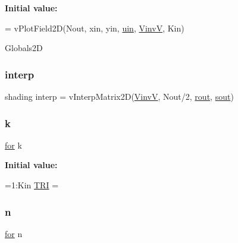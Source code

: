 {\bfseries Initial value\+:}
\begin{DoxyCode}
= vPlotField2D(Nout, xin, yin, \hyperlink{a00473_ab528855467ba0360924bbd0dd81edb35}{uin}, \hyperlink{a00473_a8ef32285093ff36729ef70bb1e8149c4}{VinvV}, Kin)


Globals2D
\end{DoxyCode}
\mbox{\label{a00563_a7626c967b638c3cc70c7c96863cbd07f}} 
\subsubsection{\texorpdfstring{interp}{interp}}
{\footnotesize\ttfamily shading interp = v\+Interp\+Matrix2D(\hyperlink{a00473_a8ef32285093ff36729ef70bb1e8149c4}{VinvV}, Nout/2, \hyperlink{a00563_a2428903c9f57e3eba1ab8aa2ea4ad70b}{rout}, \hyperlink{a00563_af37c7e7d7baefebf97f9b18e437d3a0b}{sout})}

\mbox{\label{a00563_a1c73327b2882639bc9f5e416bb3cc7ac}} 
\subsubsection{\texorpdfstring{k}{k}}
{\footnotesize\ttfamily \hyperlink{a00623_ad1e7380d51df1e0043d24d3c8a860e0a}{for} k}

{\bfseries Initial value\+:}
\begin{DoxyCode}
=1:Kin
  \hyperlink{a00563_a558baeb50ad046e899b5e64f957b043f}{TRI} = 
\end{DoxyCode}
\mbox{\label{a00563_a4c2d80ab32fc3a598413ae25e9f2bdce}} 
\subsubsection{\texorpdfstring{n}{n}}
{\footnotesize\ttfamily \hyperlink{a00623_ad1e7380d51df1e0043d24d3c8a860e0a}{for} n}

